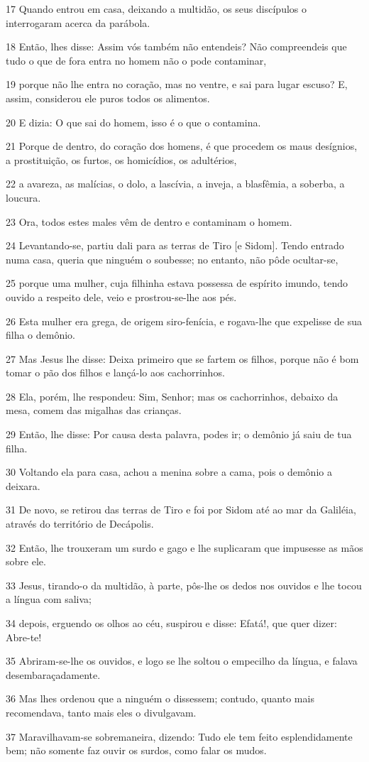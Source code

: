 \par 17 Quando entrou em casa, deixando a multidão, os seus discípulos o interrogaram acerca da parábola.
\par 18 Então, lhes disse: Assim vós também não entendeis? Não compreendeis que tudo o que de fora entra no homem não o pode contaminar,
\par 19 porque não lhe entra no coração, mas no ventre, e sai para lugar escuso? E, assim, considerou ele puros todos os alimentos.
\par 20 E dizia: O que sai do homem, isso é o que o contamina.
\par 21 Porque de dentro, do coração dos homens, é que procedem os maus desígnios, a prostituição, os furtos, os homicídios, os adultérios,
\par 22 a avareza, as malícias, o dolo, a lascívia, a inveja, a blasfêmia, a soberba, a loucura.
\par 23 Ora, todos estes males vêm de dentro e contaminam o homem.
\par 24 Levantando-se, partiu dali para as terras de Tiro [e Sidom]. Tendo entrado numa casa, queria que ninguém o soubesse; no entanto, não pôde ocultar-se,
\par 25 porque uma mulher, cuja filhinha estava possessa de espírito imundo, tendo ouvido a respeito dele, veio e prostrou-se-lhe aos pés.
\par 26 Esta mulher era grega, de origem siro-fenícia, e rogava-lhe que expelisse de sua filha o demônio.
\par 27 Mas Jesus lhe disse: Deixa primeiro que se fartem os filhos, porque não é bom tomar o pão dos filhos e lançá-lo aos cachorrinhos.
\par 28 Ela, porém, lhe respondeu: Sim, Senhor; mas os cachorrinhos, debaixo da mesa, comem das migalhas das crianças.
\par 29 Então, lhe disse: Por causa desta palavra, podes ir; o demônio já saiu de tua filha.
\par 30 Voltando ela para casa, achou a menina sobre a cama, pois o demônio a deixara.
\par 31 De novo, se retirou das terras de Tiro e foi por Sidom até ao mar da Galiléia, através do território de Decápolis.
\par 32 Então, lhe trouxeram um surdo e gago e lhe suplicaram que impusesse as mãos sobre ele.
\par 33 Jesus, tirando-o da multidão, à parte, pôs-lhe os dedos nos ouvidos e lhe tocou a língua com saliva;
\par 34 depois, erguendo os olhos ao céu, suspirou e disse: Efatá!, que quer dizer: Abre-te!
\par 35 Abriram-se-lhe os ouvidos, e logo se lhe soltou o empecilho da língua, e falava desembaraçadamente.
\par 36 Mas lhes ordenou que a ninguém o dissessem; contudo, quanto mais recomendava, tanto mais eles o divulgavam.
\par 37 Maravilhavam-se sobremaneira, dizendo: Tudo ele tem feito esplendidamente bem; não somente faz ouvir os surdos, como falar os mudos.

